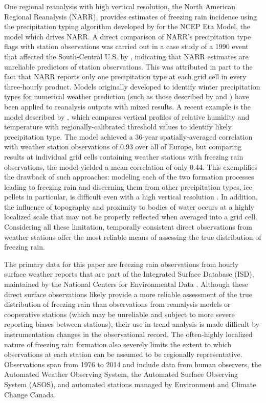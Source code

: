 \documentclass[twocol]{ametsoc}
\begin{document}
One regional reanalysis with high vertical resolution, the North American Regional Reanalysis (NARR), provides estimates of freezing rain incidence using the precipitation typing algorithm developed by \citet{baldwin1993development} for the NCEP Eta Model, the model which drives NARR. A direct comparison of NARR's precipitation type flags with station observations was carried out in a case study of a 1990 event that affected the South-Central U.S. by \citet{blunden2011138}, indicating that NARR estimates are unreliable predictors of station observations. This was attributed in part to the fact that NARR reports only one precipitation type at each grid cell in every three-hourly product. Models originally developed to identify winter precipitation types for numerical weather prediction (such as those described by \citet{cortinas2002probabilistic} and \citet{mullens2017multialgorithm}) have been applied to reanalysis outputs with mixed results. A recent example is the model described by \citet{kamarainen2017method}, which compares vertical profiles of relative humidity and temperature with regionally-calibrated threshold values to identify likely precipitation type. The model achieved a 36-year spatially-averaged correlation with weather station observations of 0.93 over all of Europe, but comparing results at individual grid cells containing weather stations with freezing rain observations, the model yielded a mean correlation of only 0.44. This exemplifies the drawback of such approaches: modeling each of the two formation processes leading to freezing rain and discerning them from other precipitation types, ice pellets in particular, is difficult even with a high vertical resolution \citep{reeves2014sources}. In addition, the influence of topography and proximity to bodies of water occurs at a highly localized scale that may not be properly reflected when averaged into a grid cell. Considering all these limitation, temporally consistent direct observations from weather stations offer the most reliable means of assessing the true distribution of freezing rain.

The primary data for this paper are freezing rain observations from hourly surface weather reports that are part of the Integrated Surface Database (ISD), maintained by the National Centers for Environmental Data \citep{smith2011integrated}. Although these direct surface observations likely provide a more reliable assessment of the true distribution of freezing rain than observations from reanalysis models or cooperative stations (which may be unreliable and subject to more severe reporting biases between stations), their use in trend analysis is made difficult by instrumentation changes in the observational record. The often-highly localized nature of freezing rain formation also severely limits the extent to which observations at each station can be assumed to be regionally representative. Observations span from 1976 to 2014 and include data from human observers, the Automated Weather Observing System, the Automated Surface Observing System (ASOS), and automated stations managed by Environment and Climate Change Canada.
\end{document}
